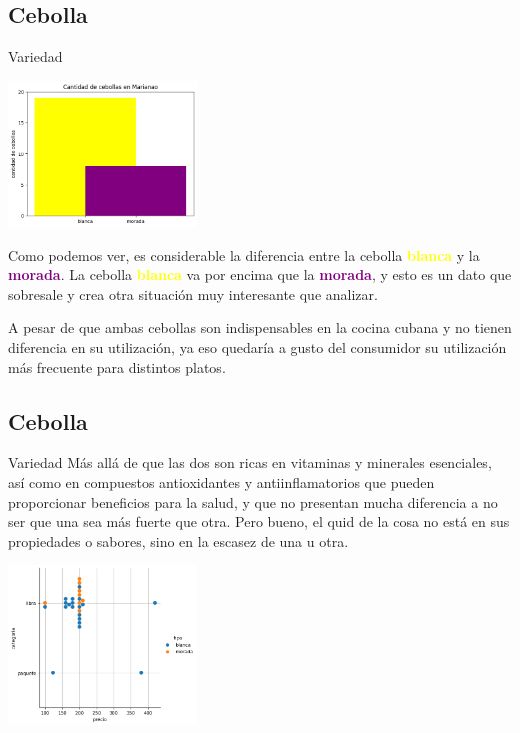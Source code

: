 \subsection{Cebolla}
\begin{frame}[fragile]{Variedad}
  \begin{center}
    \includegraphics[width=5cm]{variedad.png}
  \end{center}
  Como podemos ver, es considerable la diferencia entre la cebolla \textbf{\textcolor{yellow}{blanca}} y la \textbf{\textcolor{purple}{morada}}. 
  La cebolla \textbf{\textcolor{yellow}{blanca}} va por encima que la \textbf{\textcolor{purple}{morada}}, y esto es un dato que sobresale y crea otra situación muy interesante que analizar.

 A pesar de que ambas cebollas son indispensables en la cocina cubana y no tienen diferencia en su utilización, ya eso quedaría a gusto del consumidor su utilización más frecuente para distintos platos. 
 
\end{frame}

\subsection{Cebolla}
\begin{frame}[fragile]{Variedad}
  Más allá de que las dos son ricas en vitaminas y minerales esenciales, así como en compuestos antioxidantes y antiinflamatorios que pueden proporcionar beneficios para la salud, y que no presentan mucha diferencia a no ser que una sea más fuerte que otra. 
 Pero bueno, el quid de la cosa no está en sus propiedades o sabores, sino en la escasez de una u otra.
 \begin{center}
  \includegraphics[width=5cm]{variedad1.png}
 \end{center}
\end{frame}

